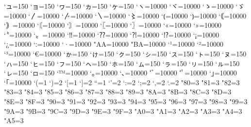 \prebreakpenalty`ュ=150
\prebreakpenalty`ョ=150
\prebreakpenalty`ヮ=150%
\prebreakpenalty`ヵ=150%
\prebreakpenalty`ヶ=150%
\prebreakpenalty`ヽ=10000
\prebreakpenalty`ヾ=10000
\prebreakpenalty`ゝ=10000
\prebreakpenalty`ゞ=10000
\prebreakpenalty`〳=10000
\prebreakpenalty`〴=10000
\prebreakpenalty`〵=10000
\prebreakpenalty`〻=10000
\postbreakpenalty`⦅=10000
\prebreakpenalty`⦆=10000
\postbreakpenalty`｟=10000
\prebreakpenalty`｠=10000
\postbreakpenalty`〘=10000
\prebreakpenalty`〙=10000
\postbreakpenalty`〖=10000
\prebreakpenalty`〗=10000
\postbreakpenalty`«=10000
\prebreakpenalty`»=10000
\postbreakpenalty`〝=10000
\prebreakpenalty`〟=10000
\prebreakpenalty`‼=10000
\prebreakpenalty`⁇=10000
\prebreakpenalty`⁈=10000
\prebreakpenalty`⁉=10000
\postbreakpenalty`¡=10000
\postbreakpenalty`¿=10000
\prebreakpenalty`ː=10000
\prebreakpenalty`·=10000
\prebreakpenalty"AA=10000%
\prebreakpenalty"BA=10000%
\prebreakpenalty`¹=10000
\prebreakpenalty`²=10000
\prebreakpenalty`³=10000
\postbreakpenalty`€=10000
\prebreakpenalty`ゕ=150
\prebreakpenalty`ゖ=150
\prebreakpenalty`ㇰ=150
\prebreakpenalty`ㇱ=150
\prebreakpenalty`ㇲ=150
\prebreakpenalty`ㇳ=150
\prebreakpenalty`ㇴ=150
\prebreakpenalty`ㇵ=150
\prebreakpenalty`ㇶ=150
\prebreakpenalty`ㇷ=150
\prebreakpenalty`ㇸ=150
\prebreakpenalty`ㇹ=150
\prebreakpenalty`ㇺ=150
\prebreakpenalty`ㇻ=150
\prebreakpenalty`ㇼ=150
\prebreakpenalty`ㇽ=150
\prebreakpenalty`ㇾ=150
\prebreakpenalty`ㇿ=150
\prebreakpenalty`™=10000
\prebreakpenalty`｡=10000
\prebreakpenalty`､=10000
\prebreakpenalty`ﾞ=10000
\prebreakpenalty`ﾟ=10000
\prebreakpenalty`｣=10000
\postbreakpenalty`｢=10000
\xspcode`(=1
\xspcode`)=2
\xspcode`[=1
\xspcode`]=2
\xspcode``=1
\xspcode`'=2
\xspcode`:=2
\xspcode`;=2
\xspcode`,=2
\xspcode`.=2
\xspcode"80=3
\xspcode"81=3
\xspcode"82=3
\xspcode"83=3
\xspcode"84=3
\xspcode"85=3
\xspcode"86=3
\xspcode"87=3
\xspcode"88=3
\xspcode"89=3
\xspcode"8A=3
\xspcode"8B=3
\xspcode"8C=3
\xspcode"8D=3
\xspcode"8E=3
\xspcode"8F=3
\xspcode"90=3
\xspcode"91=3
\xspcode"92=3
\xspcode"93=3
\xspcode"94=3
\xspcode"95=3
\xspcode"96=3
\xspcode"97=3
\xspcode"98=3
\xspcode"99=3
\xspcode"9A=3
\xspcode"9B=3
\xspcode"9C=3
\xspcode"9D=3
\xspcode"9E=3
\xspcode"9F=3
\xspcode"A0=3
\xspcode"A1=3
\xspcode"A2=3
\xspcode"A3=3
\xspcode"A4=3
\xspcode"A5=3
